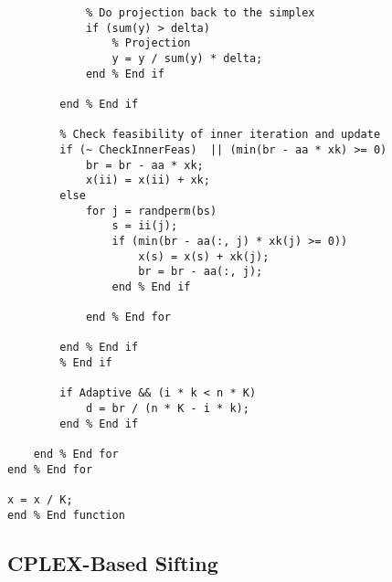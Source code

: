 \documentclass{article}
\begin{document}
\begin{lstlisting}
            % Do projection back to the simplex
            if (sum(y) > delta)
                % Projection
                y = y / sum(y) * delta;
            end % End if
            
        end % End if
        
        % Check feasibility of inner iteration and update
        if (~ CheckInnerFeas)  || (min(br - aa * xk) >= 0)
            br = br - aa * xk;
            x(ii) = x(ii) + xk;
        else
            for j = randperm(bs)
                s = ii(j);
                if (min(br - aa(:, j) * xk(j) >= 0))
                    x(s) = x(s) + xk(j);
                    br = br - aa(:, j);
                end % End if
                
            end % End for
            
        end % End if
        % End if
        
        if Adaptive && (i * k < n * K)
            d = br / (n * K - i * k);
        end % End if
        
    end % End for
end % End for

x = x / K;
end % End function

\end{lstlisting}



\subsection{CPLEX-Based Sifting}
\end{document}
